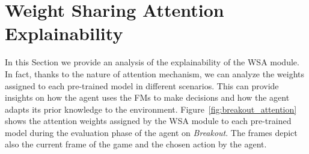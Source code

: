 \section{Weight Sharing Attention Explainability}\label{sec:explainability}


In this Section we provide an analysis of the explainability of the WSA module.
In fact, thanks to the nature of attention mechanism, we can analyze the weights assigned to each pre-trained model in different scenarios.
This can provide insights on how the agent uses the FMs to make decisions and how the agent adapts its prior knowledge to the environment.
Figure~\ref{fig:breakout_attention} shows the attention weights assigned by the WSA module to each pre-trained model during the evaluation phase of the agent on \textit{Breakout}.
The frames depict also the current frame of the game and the chosen action by the agent.

